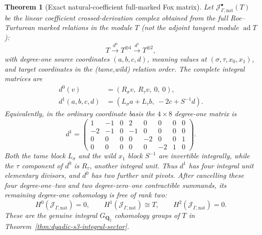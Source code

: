 \documentclass[11pt]{article}
\newtheorem{theorem}{Theorem}[section]
\theoremstyle{definition}
\begin{document}
\begin{theorem}[Exact natural-coefficient full-marked Fox matrix]
\label{thm:dyadic-s3-natural-full-marked-matrix}
Let
$\mathcal J^\bullet_{\Gamma,\mathrm{nat}}(T)$
be the linear \emph{coefficient}
crossed-derivation complex obtained
from the full Roe--Turturean
marked relations in the module $T$
(not the adjoint tangent module
$\operatorname{ad}T$):
\begin{equation}\label{eq:dyadic-s3-natural-three-term-complex}
T\xrightarrow{d^0}T^{\oplus4}
\xrightarrow{d^1}T^{\oplus2},
\end{equation}
with degree-one source coordinates
$(a,b,c,d)$, meaning values at
$(\sigma,\tau,x_0,x_1)$, and target
coordinates in the (tame,wild)
relation order.  The \emph{complete
integral} matrices are
\begin{equation}\label{eq:dyadic-s3-natural-differentials}
\boxed{
\begin{aligned}
d^0(v)&=(R_\sigma v,\ R_\tau v,\ 0,\ 0),
\\
d^1(a,b,c,d)
&=(L_\sigma a+L_\tau b,\ -2c+S^{-1}d).
\end{aligned}}
\end{equation}
Equivalently, in the ordinary
coordinate basis the $4\times8$
degree-one matrix is
\begin{equation}\label{eq:dyadic-s3-natural-4x8-jacobian}
\boxed{\quad
d^1=
\begin{pmatrix}
 1&-1&0&2&0&0&0&0\\
 -2&-1&0&-1&0&0&0&0\\
 0&0&0&0&-2&0&0&1\\
 0&0&0&0&0&-2&1&0
\end{pmatrix}.
\quad}
\end{equation}
Both the tame block $L_\sigma$
and the wild $x_1$ block
$S^{-1}$ are invertible
integrally, while the $\tau$
component of $d^0$ is
$R_\tau$, another integral unit.
Thus $d^1$ has four integral
unit elementary divisors,
and $d^0$ has two further
unit pivots.  After cancelling
these four degree-one--two and
two degree-zero--one contractible
summands, its remaining degree-one
cohomology is free of rank two:
\begin{equation}\label{eq:dyadic-s3-natural-marked-cohomology}
H^0(\mathcal J_{\Gamma,\mathrm{nat}})=0,
\qquad
H^1(\mathcal J_{\Gamma,\mathrm{nat}})
\cong T,\qquad
H^2(\mathcal J_{\Gamma,\mathrm{nat}})=0.
\end{equation}
These are the genuine integral
$G_{\mathbf Q_2}$ cohomology groups
of $T$ in
Theorem~\ref{thm:dyadic-s3-integral-sector}.
\end{theorem}
\end{document}
